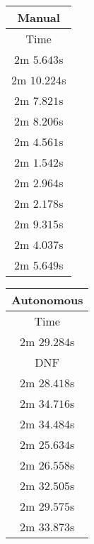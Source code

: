 \begin{appendices}
\begin{table}[!h]
	\centering
	\begin{tabular}{ c }
		\toprule
		\textbf{Manual} \\
		\midrule
		Time \\
		\midrule
		$2$m $5.643$s \\

		$2$m $10.224$s \\

		$2$m $7.821$s \\

		$2$m $8.206$s \\

		$2$m $4.561$s \\

		$2$m $1.542$s \\

		$2$m $2.964$s \\

		$2$m $2.178$s \\

		$2$m $9.315$s \\

		$2$m $4.037$s \\

		\midrule
		$2$m $5.649$s \\
		\bottomrule
	\end{tabular}
	\hspace{2ex}
	\begin{tabular}{ c }
		\toprule
		\textbf{Autonomous} \\
		\midrule
		Time \\
		\midrule
		$2$m $29.284$s \\

		DNF \\
				
		$2$m $28.418$s \\

		$2$m $34.716$s \\

		$2$m $34.484$s \\

		$2$m $25.634$s \\

		$2$m $26.558$s \\

		$2$m $32.505$s \\

		$2$m $29.575$s \\

		$2$m $33.873$s \\


\end{tabular}
\end{table}
\end{appendices}
